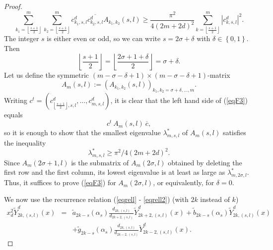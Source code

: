 \documentclass[12pt]{amsart}
\begin{document}
\begin{proof}
\begin{equation}
\sum_{k_{1}=\left\lfloor \frac{s+1}{2}\right\rfloor }^{m}\sum_{k_{2}=\left\lfloor \frac{s+1}{2}%
\right\rfloor }^{m}c^d_{k_{1},s,l}\overline{c^d_{k_{2},s,l}}A_{k_{1},k_{2 }}\left(
s,l\right) 
\geq
 \frac{\pi ^{2}}{4\left( 2m + 2d  \right) ^{2}}\sum_{k=\left\lfloor 
\frac{s+1}{2}\right\rfloor }^{m}\left\vert c^d_{k,s,l}\right\vert ^{2}.  \label{eqF3}
\end{equation}
 The integer $s$ is either even or odd,
so we can write $s=2\sigma +\delta $ with $\delta \in \left\{ 0,1\right\}.$ 
Then 
\begin{equation*}
\left\lfloor \frac{s+1}{2}\right\rfloor =\left\lfloor \frac{2\sigma +1+\delta }{2}\right\rfloor
=\sigma +\delta .
\end{equation*}%
Let us define the symmetric $\left( m-\sigma -\delta +1\right) \times \left(
m-\sigma -\delta +1\right) $-matrix 
\begin{equation*}
A_{m}\left( s,l\right) :=\left( A_{k_{1},k_{2}}\left( s,l\right) \right)
_{k_{1},k_{2}=\sigma +\delta ,\dots , m}.
\end{equation*}
Writing $c^t = \left(c^d_{\left\lfloor \frac{s +1}{2}\right\rfloor, s,l}, \dots,  c^d_{m,s,l}\right)$, it is clear that the left hand side of (\ref{eqF3}) equals 
$$
c^t \ A_m(s,l) \ \overline{c},
$$
so it is enough to show that  the  smallest eigenvalue $\lambda _{m, s,l}^{\ast }$  of
 $A_m \left( s,l\right) $
satisfies the inequality 
$$
\lambda _{m, s,l}^{\ast }
\ge
\pi ^{2}/4\left( 2m+2d\right) ^{2}.
$$
Since $A_{m}\left( 2\sigma +1,l\right) $ is the submatrix of $A_{m}\left(
2\sigma ,l\right)$ obtained by deleting the first row and the first column, its lowest eigenvalue is at least as large as $\lambda _{m, 2\sigma,l}^{\ast }$. Thus, it suffices to prove (\ref{eqF3}) for $
A_{m}\left( 2\sigma ,l\right) $, or equivalently, for  $\delta =0.$



We now use the recurrence relation (\ref{eqrell} - \ref{eqrell2}) (with $2 k$ 
instead of  $k$)  
\begin{eqnarray*}
x_{d}^{2}\widetilde{Y}_{2k,\left( s,l\right) }^{d}\left( x\right) &=&%
\widetilde{a}_{2k-s}\left( \alpha _{s}\right) \frac{d_{2k,\left( s,l\right) }%
}{d_{2k+2,\left( s,l\right) }}\widetilde{Y}_{2k+2,\left( s,l\right)
}^{d}\left( x\right) +\widetilde{b}_{2k-s}\left( \alpha _{s}\right) 
\widetilde{Y}_{2k,\left( s,l\right) }^{d}\left( x\right) \\
&&+\widetilde{g}_{2k-s}\left( \alpha _{s}\right) \frac{d_{2k,\left(
s,l\right) }}{d_{2k-2,\left( s,l\right) }}\widetilde{Y}_{2k-2,\left(
s,l\right) }^{d}\left( x\right) .
\end{eqnarray*}


\end{proof}
\end{document}
